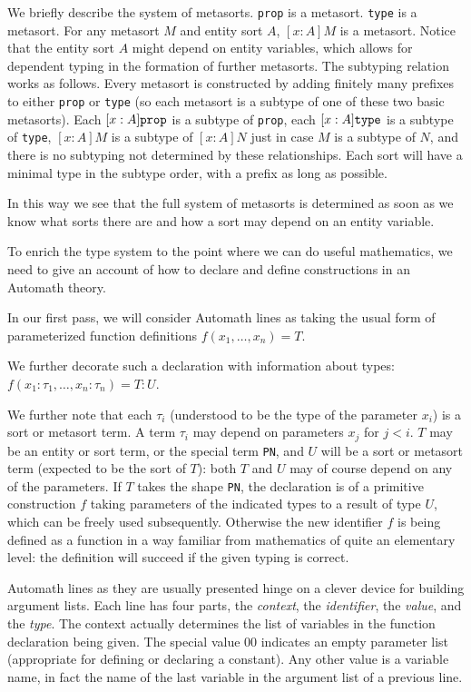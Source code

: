 \documentclass[12pt]{article}
\begin{document}
We briefly describe the system of metasorts.  {\tt prop} is a metasort.  {\tt type} is a metasort.  For any metasort $M$ and entity sort $A$, $[x:A]M$ is a metasort.  Notice that
the entity sort $A$ might depend on  entity variables, which allows for dependent typing in the formation of further metasorts.  The subtyping relation works as follows.   Every metasort is constructed by adding finitely many prefixes to either {\tt prop} or {\tt type} (so each metasort
is a subtype of one of these two basic metasorts).   Each $[x:A]{\tt prop}$ is a subtype of {\tt prop}, each $[x:A]{\tt type}$ is a subtype of {\tt type}, $[x:A]M$ is a subtype of $[x:A]N$ just in case $M$ is a subtype of $N$, and there is no subtyping not determined by these relationships.  Each sort will have a minimal type in the subtype order, with a prefix as long as possible.

In this way we see that the full system of metasorts is determined as soon as we know what sorts there are and how a sort may depend on an entity variable.

To enrich the type system to the point where we can do useful mathematics, we need to give an account of how to declare and define constructions in an Automath theory.

In our first pass, we will consider Automath lines as taking the  usual form of parameterized function definitions $f(x_1,\ldots,x_n)=T$.

We further decorate such a declaration with information about types:  $f(x_1:\tau_1,\ldots,x_n:\tau_n)=T:U$.

We further note that each $\tau_i$ (understood to be the type of the parameter $x_i$) is a sort or metasort term.  A term $\tau_i$ may depend on parameters $x_j$ for $j<i$.
$T$ may be an entity or sort term, or the special term {\tt PN}, and $U$ will be a sort or metasort term (expected to be the sort of $T$):  both $T$ and $U$ may of course depend on any of the parameters.  If $T$ takes the shape {\tt PN}, the declaration is of a primitive construction $f$ taking parameters of the indicated types to a result of type $U$, which can be freely used subsequently.  Otherwise the new identifier $f$ is being defined as a function in a way familiar from mathematics of quite an elementary level:  the definition will succeed if the given typing is correct.

Automath lines as they are usually presented hinge on a clever device for building argument lists.   Each line has four parts, the {\em context\/}, the {\em identifier}, the {\em value}, and the {\em type}.  The context actually determines the list of variables in the function declaration being given.  The special value 00 indicates an empty parameter list (appropriate for defining or declaring a constant).  Any other value is a variable name, in fact the name of the last variable in the argument list of a previous line.
\end{document}
